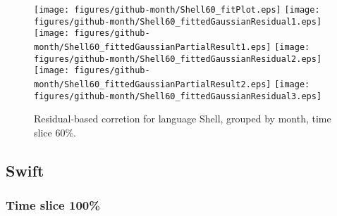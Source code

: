 \begin{figure}[hb]
\centering
{}
{\texttt{[image: figures/github-month/Shell60\_fitPlot.eps]}}
{\texttt{[image: figures/github-month/Shell60\_fittedGaussianResidual1.eps]}}
{\texttt{[image: figures/github-month/Shell60\_fittedGaussianPartialResult1.eps]}}
{\texttt{[image: figures/github-month/Shell60\_fittedGaussianResidual2.eps]}}
{\texttt{[image: figures/github-month/Shell60\_fittedGaussianPartialResult2.eps]}}
{\texttt{[image: figures/github-month/Shell60\_fittedGaussianResidual3.eps]}}
\caption{Residual-based corretion for language Shell, grouped by month, time slice 60\%.}
\end{figure}


\clearpage 
\newpage 


\subsection{Swift}

\FloatBarrier

\subsubsection{Time slice 100\%}

